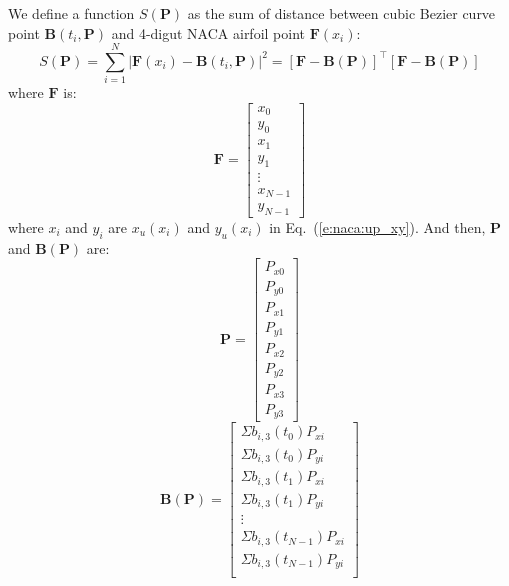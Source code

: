 \documentclass{turgon}
\begin{document}
We define a function $S(\mathbf{P})$ as the sum of distance between cubic
Bezier curve point $\mathbf{B}(t_i, \mathbf{P})$ and 4-digut NACA airfoil
point $\mathbf{F}(x_i)$:
\begin{equation*}
    S(\mathbf{P}) = \sum_{i=1}^N \left|
        \mathbf{F}(x_i) - \mathbf{B}(t_i, \mathbf{P}) \right|^2 =
    \left[ \mathbf{F} - \mathbf{B}(\mathbf{P}) \right]^\top
    \left[ \mathbf{F} - \mathbf{B}(\mathbf{P}) \right]
\end{equation*}
where $\mathbf{F}$ is:
\begin{equation*}
    \mathbf{F} =
    \begin{bmatrix}
        x_0 \\ y_0 \\ x_1 \\ y_1 \\ \vdots \\ x_{N-1} \\ y_{N-1}
    \end{bmatrix}
\end{equation*}
where $x_i$ and $y_i$ are $x_u(x_i)$ and $y_u(x_i)$ in
Eq.~(\ref{e:naca:up_xy}). And then, $\mathbf{P}$ and
$\mathbf{B}(\mathbf{P})$ are:
\begin{equation*}
    \mathbf{P} =
    \begin{bmatrix}
        P_{x0} \\ P_{y0} \\ P_{x1} \\ P_{y1} \\
        P_{x2} \\ P_{y2} \\ P_{x3} \\ P_{y3}
    \end{bmatrix}
\end{equation*}
\begin{equation*}
    \mathbf{B}(\mathbf{P}) =
    \begin{bmatrix}
        \Sigma b_{i,3}(t_0)P_{xi} \\
        \Sigma b_{i,3}(t_0)P_{yi} \\
        \Sigma b_{i,3}(t_1)P_{xi} \\
        \Sigma b_{i,3}(t_1)P_{yi} \\
        \vdots \\
        \Sigma b_{i,3}(t_{N-1})P_{xi} \\
        \Sigma b_{i,3}(t_{N-1})P_{yi} \\
    \end{bmatrix}
\end{equation*}
\end{document}
